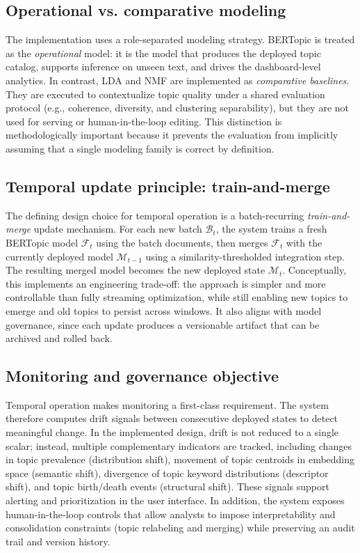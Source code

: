 \documentclass[conference]{IEEEtran}
\newcommand{\bertopic}{BERTopic\xspace}
\newcommand{\lda}{LDA\xspace}
\newcommand{\nmf}{NMF\xspace}
\begin{document}
\subsection{Operational vs. comparative modeling}
The implementation uses a role-separated modeling strategy. \bertopic is treated as the \emph{operational} model: it is the model that produces the deployed topic catalog, supports inference on unseen text, and drives the dashboard-level analytics. In contrast, \lda and \nmf are implemented as \emph{comparative baselines}. They are executed to contextualize topic quality under a shared evaluation protocol (e.g., coherence, diversity, and clustering separability), but they are not used for serving or human-in-the-loop editing. This distinction is methodologically important because it prevents the evaluation from implicitly assuming that a single modeling family is correct by definition.

\subsection{Temporal update principle: train-and-merge}
The defining design choice for temporal operation is a batch-recurring \emph{train-and-merge} update mechanism. For each new batch \(\mathcal{B}_t\), the system trains a fresh \bertopic model \(\mathcal{F}_t\) using the batch documents, then merges \(\mathcal{F}_t\) with the currently deployed model \(\mathcal{M}_{t-1}\) using a similarity-thresholded integration step. The resulting merged model becomes the new deployed state \(\mathcal{M}_t\). Conceptually, this implements an engineering trade-off: the approach is simpler and more controllable than fully streaming optimization, while still enabling new topics to emerge and old topics to persist across windows. It also aligns with model governance, since each update produces a versionable artifact that can be archived and rolled back.

\subsection{Monitoring and governance objective}
Temporal operation makes monitoring a first-class requirement. The system therefore computes drift signals between consecutive deployed states to detect meaningful change. In the implemented design, drift is not reduced to a single scalar; instead, multiple complementary indicators are tracked, including changes in topic prevalence (distribution shift), movement of topic centroids in embedding space (semantic shift), divergence of topic keyword distributions (descriptor shift), and topic birth/death events (structural shift). These signals support alerting and prioritization in the user interface. In addition, the system exposes human-in-the-loop controls that allow analysts to impose interpretability and consolidation constraints (topic relabeling and merging) while preserving an audit trail and version history.
\end{document}
